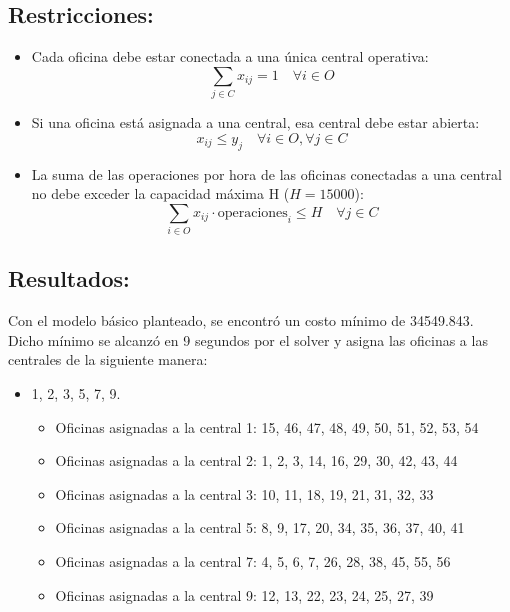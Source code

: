 \documentclass{article}
\begin{document}
\subsection*{Restricciones:}

\begin{itemize}
    \item Cada oficina debe estar conectada a una única central operativa:
    \[
    \sum_{j \in C} x_{ij} = 1 \quad \forall i \in O
    \]
    
    \item Si una oficina está asignada a una central, esa central debe estar abierta:
    \[
    x_{ij} \leq y_j \quad \forall i \in O, \forall j \in C
    \]

    \item La suma de las operaciones por hora de las oficinas conectadas a una central no debe exceder la capacidad máxima H (\(H = 15000\)):
    \[
    \sum_{i \in O} x_{ij} \cdot \text{operaciones}_i \leq H \quad \forall j \in C
    \]
\end{itemize}

\subsection*{Resultados:}

Con el modelo básico planteado, se encontró un costo mínimo de 34549.843. Dicho mínimo se alcanzó en 9 segundos por el solver y asigna las oficinas a las centrales de la siguiente manera:
\vspace{0.5cm}

\begin{itemize}
    \item{} 1, 2, 3, 5, 7, 9.
	\begin{itemize}
	\item Oficinas asignadas a la central 1: 15, 46, 47, 48, 49, 50, 51, 52, 53, 54
	\item Oficinas asignadas a la central 2: 1, 2, 3, 14, 16, 29, 30, 42, 43, 44
	\item Oficinas asignadas a la central 3: 10, 11, 18, 19, 21, 31, 32, 33
	\item Oficinas asignadas a la central 5: 8, 9, 17, 20, 34, 35, 36, 37, 40, 41
	\item Oficinas asignadas a la central 7: 4, 5, 6, 7, 26, 28, 38, 45, 55, 56
	\item Oficinas asignadas a la central 9: 12, 13, 22, 23, 24, 25, 27, 39
	\end{itemize}
\end{itemize}
\end{document}
